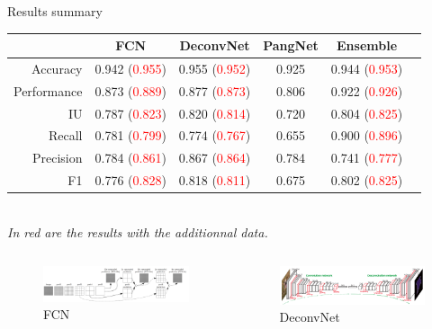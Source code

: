 \documentclass{beamer}
\begin{document}
\begin{frame}{Results summary}
\begin{small}
\begin{tabular}{r|c|c|c|c|c|}
     &        FCN &     DeconvNet  & PangNet & Ensemble \\
\hline
Accuracy           &        0.942 (\textcolor{red}{0.955}) &     0.955 (\textcolor{red}{0.952}) &       0.925 & 0.944  (\textcolor{red}{0.953})  \\
Performance      &        0.873 (\textcolor{red}{0.889}) &     0.877 (\textcolor{red}{0.873}) &       0.806 & 0.922 (\textcolor{red}{0.926}) \\
IU                      &        0.787 (\textcolor{red}{0.823}) &     0.820 (\textcolor{red}{0.814}) &       0.720 & 0.804 (\textcolor{red}{0.825}) \\
Recall                &        0.781 (\textcolor{red}{0.799})  &     0.774 (\textcolor{red}{0.767}) &        0.655 & 0.900 (\textcolor{red}{0.896}) \\
Precision            &        0.784 (\textcolor{red}{0.861}) &     0.867 (\textcolor{red}{0.864}) &        0.784 & 0.741 (\textcolor{red}{0.777})  \\
F1                     &        0.776 (\textcolor{red}{0.828}) &     0.818 (\textcolor{red}{0.811}) &       0.675 & 0.802 (\textcolor{red}{0.825}) \\
\end{tabular} 
\\
\textit{In red are the results with the additionnal data.}
\end{small}

\begin{columns}

\begin{column}{0.5\textwidth}
\begin{figure}
\includegraphics[width = 1.12\linewidth, left]{FCN.png}
\caption{FCN}
\end{figure}
\end{column}

\begin{column}{0.3\textwidth}
\begin{figure}
\includegraphics[width = 1.1\linewidth]{DeconvNet.png}
\caption{DeconvNet}
\end{figure}
\end{column}


\end{columns}
\end{frame}
\end{document}
